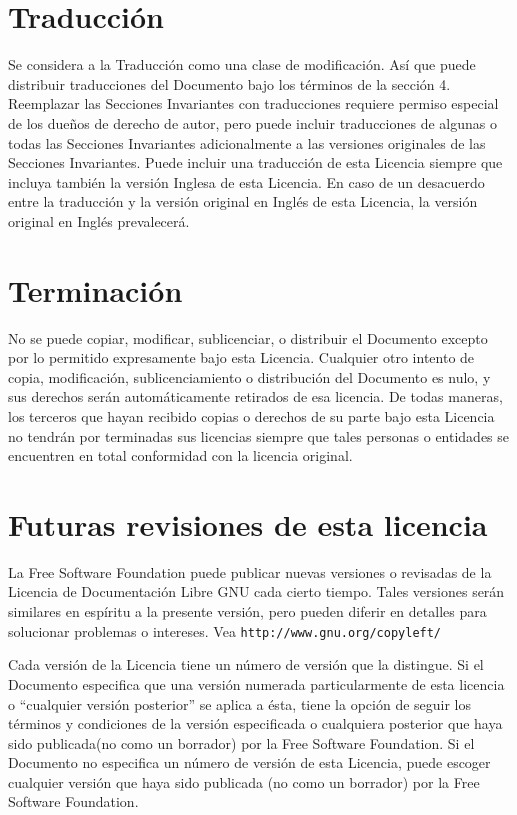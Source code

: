 \section{Traducción}

Se considera a  la Traducción como una clase de  modificación. Así que
puede distribuir  traducciones del Documento  bajo los términos  de la
sección  4.  Reemplazar  las Secciones  Invariantes  con  traducciones
requiere  permiso  especial  de  los   dueños  de  derecho  de  autor,
pero  puede incluir  traducciones  de algunas  o  todas las  Secciones
Invariantes adicionalmente a las versiones originales de las Secciones
Invariantes. Puede incluir una traducción de esta Licencia siempre que
incluya también  la versión Inglesa  de esta  Licencia. En caso  de un
desacuerdo entre la traducción y la versión original en Inglés de esta
Licencia, la versión original en Inglés prevalecerá.

\section{Terminación}

No se puede copiar, modificar, sublicenciar, o distribuir el Documento
excepto por  lo permitido  expresamente bajo esta  Licencia. Cualquier
otro intento de copia,  modificación, sublicenciamiento o distribución
del Documento es nulo, y  sus derechos serán automáticamente retirados
de esa  licencia. De  todas maneras, los  terceros que  hayan recibido
copias  o derechos  de  su parte  bajo esta  Licencia  no tendrán  por
terminadas sus  licencias siempre  que tales  personas o  entidades se
encuentren en total conformidad con la licencia original.

\section{Futuras revisiones de esta licencia}

La  Free  Software  Foundation   puede  publicar  nuevas  versiones  o
revisadas  de  la Licencia  de  Documentación  Libre GNU  cada  cierto
tiempo.  Tales versiones  serán similares  en espíritu  a la  presente
versión, pero pueden  diferir en detalles para  solucionar problemas o
intereses. Vea {\tt http://www.gnu.org/copyleft/}

Cada  versión  de la  Licencia  tiene  un  número  de versión  que  la
distingue.  Si  el  Documento  especifica  que  una  versión  numerada
particularmente de esta licencia  o ``cualquier versión posterior'' se
aplica a  ésta, tiene la opción  de seguir los términos  y condiciones
de  la  versión especificada  o  cualquiera  posterior que  haya  sido
publicada(no como un borrador) por  la Free Software Foundation. Si el
Documento no especifica  un número de versión de  esta Licencia, puede
escoger  cualquier  versión  que  haya  sido  publicada  (no  como  un
borrador) por la Free Software Foundation.

